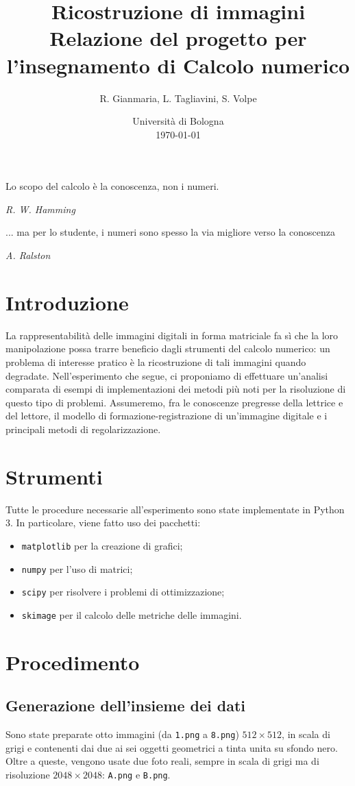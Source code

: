 \documentclass[a4paper]{article}
\title{
  Ricostruzione di immagini \\ \large Relazione del progetto per
  l'insegnamento di Calcolo numerico
}
\author{
  R. Gianmaria,
  L. Tagliavini,
  S. Volpe
}
\date{
	Universit\`a di Bologna \\
  \today
}
\begin{document}
\maketitle
\thispagestyle{empty}

\pagebreak
\setcounter{page}{1}
\tableofcontents
\pagebreak
{}

\epigraph{Lo scopo del calcolo è la conoscenza, non i numeri.}
{\textit{R. W. Hamming}}
\epigraph{... ma per lo studente, i numeri sono spesso la via migliore verso la
conoscenza}
{\textit{A. Ralston}}

\section{Introduzione}
La rappresentabilità delle immagini digitali in forma matriciale fa sì che la
loro manipolazione possa trarre beneficio dagli strumenti del calcolo numerico:
un problema di interesse pratico è la ricostruzione di tali immagini quando
degradate. Nell'esperimento che segue, ci proponiamo di effettuare un'analisi
comparata di esempi di implementazioni dei metodi più noti per la risoluzione
di questo tipo di problemi. Assumeremo, fra le conoscenze pregresse della
lettrice e del lettore, il modello di formazione-registrazione di un'immagine
digitale e i principali metodi di regolarizzazione.

\section{Strumenti}
Tutte le procedure necessarie all'esperimento sono state implementate in Python
3. In particolare, viene fatto uso dei pacchetti:
\begin{itemize}
  \item \verb!matplotlib! per la creazione di grafici;
  \item \verb!numpy! per l'uso di matrici;
  \item \verb!scipy! per risolvere i problemi di ottimizzazione;
  \item \verb!skimage! per il calcolo delle metriche delle immagini.
\end{itemize}

\section{Procedimento}

\subsection{Generazione dell'insieme dei dati}
Sono state preparate otto immagini (da \verb!1.png! a \verb!8.png!) $512 \times
512$, in scala di grigi e contenenti dai due ai sei oggetti geometrici a tinta
unita su sfondo nero. Oltre a queste, vengono usate due foto reali, sempre in
scala di grigi ma di risoluzione $2048 \times 2048$: \verb!A.png! e
\verb!B.png!.
\end{document}

